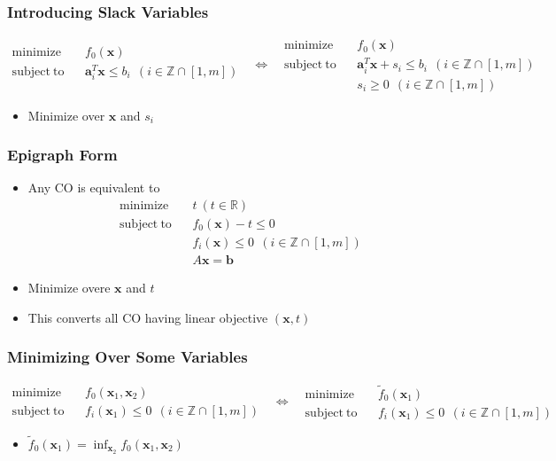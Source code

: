 \subsubsection*{Introducing Slack Variables}
$$ \begin{aligned}
    \mathrm{minimize}~~&~~f_0(\mathbf{x}) \\
    \mathrm{subject~to}~~&~~\mathbf{a}_i^T \mathbf{x} \leq b_i~~(i \in \mathbb{Z} \cap [1,m]) \\ {}
\end{aligned}~~~\Leftrightarrow~~~\begin{aligned}
    \mathrm{minimize}~~&~~f_0(\mathbf{x}) \\
    \mathrm{subject~to}~~&~~\mathbf{a}_i^T \mathbf{x} + s_i \leq b_i~~(i \in \mathbb{Z} \cap [1,m]) \\
        &~~ s_i \geq 0~~(i \in \mathbb{Z} \cap [1,m])
\end{aligned} $$
\begin{itemize}
    \item Minimize over $\mathbf{x}$ and $s_i$
\end{itemize}

\subsubsection*{Epigraph Form}
\begin{itemize}
    \item Any CO is equivalent to
        $$ \begin{aligned}
            \mathrm{minimize}~~&~~t~(t \in \mathbb{R}) \\
            \mathrm{subject~to}~~&~~f_0(\mathbf{x}) - t \leq 0 \\
                &~~f_i(\mathbf{x}) \leq 0~~(i \in \mathbb{Z} \cap [1,m]) \\
                &~~ A\mathbf{x} = \mathbf{b}
        \end{aligned} $$
    \item Minimize overe $\mathbf{x}$ and $t$
    \item This converts all CO having linear objective $(\mathbf{x}, t)$
\end{itemize}

\subsubsection*{Minimizing Over Some Variables}
$$ \begin{aligned}
    \mathrm{minimize}~~&~~f_0(\mathbf{x}_1, \mathbf{x}_2) \\
    \mathrm{subject~to}~~&~~f_i(\mathbf{x}_1) \leq 0~~(i \in \mathbb{Z} \cap [1,m])
\end{aligned}~~~\Leftrightarrow~~~\begin{aligned}
    \mathrm{minimize}~~&~~\tilde{f}_0(\mathbf{x}_1) \\
    \mathrm{subject~to}~~&~~f_i(\mathbf{x}_1) \leq 0~~(i \in \mathbb{Z} \cap [1,m])
\end{aligned} $$
\begin{itemize}
    \item $\tilde{f}_0(\mathbf{x}_1) = \inf_{\mathbf{x}_2} f_0 (\mathbf{x}_1, \mathbf{x}_2)$
\end{itemize}
